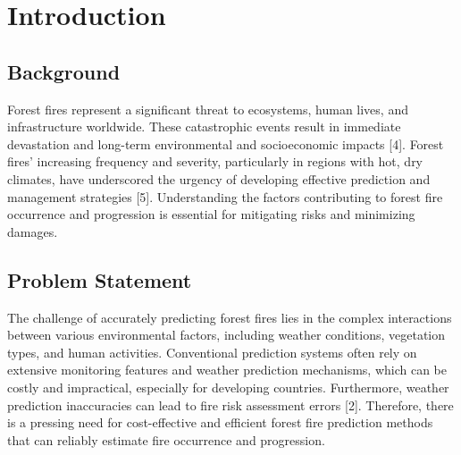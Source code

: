\chapter{Introduction}
\label{ch:into} %



\section{Background}
Forest fires represent a significant threat to ecosystems, human lives, and infrastructure worldwide. These catastrophic events result in immediate devastation and long-term environmental and socioeconomic impacts [4]. Forest fires' increasing frequency and severity, particularly in regions with hot, dry climates, have underscored the urgency of developing effective prediction and management strategies [5]. Understanding the factors contributing to forest fire occurrence and progression is essential for mitigating risks and minimizing damages.


\section{Problem Statement}
The challenge of accurately predicting forest fires lies in the complex interactions between various environmental factors, including weather conditions, vegetation types, and human activities. Conventional prediction systems often rely on extensive monitoring features and weather prediction mechanisms, which can be costly and impractical, especially for developing countries. Furthermore, weather prediction inaccuracies can lead to fire risk assessment errors [2]. Therefore, there is a pressing need for cost-effective and efficient forest fire prediction methods that can reliably estimate fire occurrence and progression.


